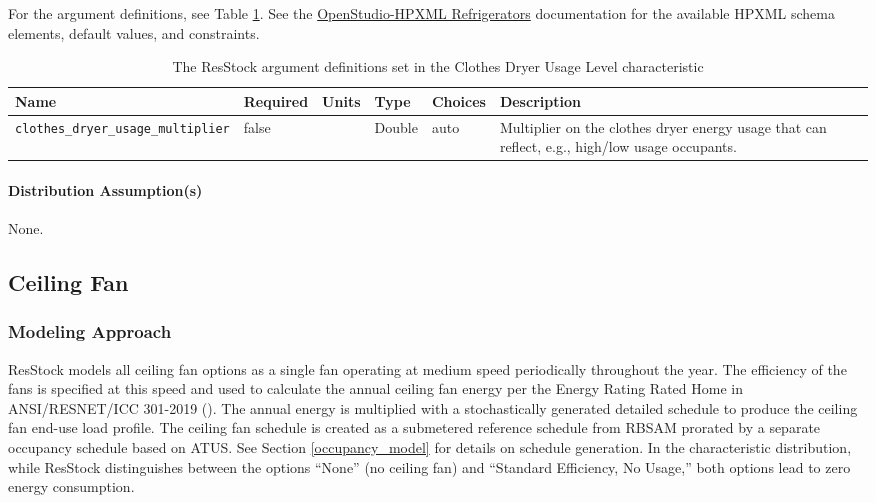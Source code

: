 For the argument definitions, see Table \ref{table:hc_arg_def_clothes_dryer_usage_level}. See the \href{https://openstudio-hpxml.readthedocs.io/en/v1.8.1/workflow_inputs.html#hpxml-refrigerators}{OpenStudio-HPXML Refrigerators} documentation for the available HPXML schema elements, default values, and constraints.

\begin{longtable}[]{ |p{}|p{1.5cm}|p{1cm}|p{1.1cm}|p{3.4cm}|p{4cm}| }
\caption{The ResStock argument definitions set in the Clothes Dryer Usage Level characteristic}\label{table:hc_arg_def_clothes_dryer_usage_level} \\
\toprule\noalign{}
Name & Required & Units & Type & Choices & Description \\
\midrule\noalign{}
\endhead
\bottomrule\noalign{}
\endlastfoot
\texttt{clothes\_dryer\_usage\_multiplier} & false & & Double & auto &
Multiplier on the clothes dryer energy usage that can reflect, e.g.,
high/low usage occupants. \\
\end{longtable}

\paragraph{Distribution Assumption(s)}
None.

\subsection{Ceiling Fan}
\subsubsection{Modeling Approach}
ResStock models all ceiling fan options as a single fan operating at medium speed periodically throughout the year. The efficiency of the fans is specified at this speed and used to calculate the annual ceiling fan energy per the Energy Rating Rated Home in ANSI/RESNET/ICC 301-2019 (\cite{ansi_resnet_301_2019}). The annual energy is multiplied with a stochastically generated detailed schedule to produce the ceiling fan end-use load profile. The ceiling fan schedule is created as a submetered reference schedule from RBSAM prorated by a separate occupancy schedule based on ATUS. See Section \ref{occupancy_model} for details on schedule generation. In the characteristic distribution, while ResStock distinguishes between the options ``None'' (no ceiling fan) and ``Standard Efficiency, No Usage,'' both options lead to zero energy consumption. 

